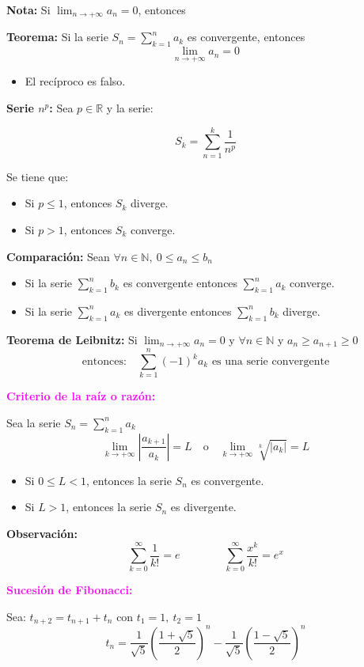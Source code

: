 \documentclass[11pt,a4paper]{article}
\begin{document}
\textbf{Nota:} Si $\displaystyle\lim_{n\to+\infty}a_n = 0$, entonces \quad
{}

\textbf{Teorema:} Si la serie $S_n = \displaystyle\sum_{k=1}^{n}a_k$ es convergente, entonces
\[\lim_{n\to+\infty}a_n = 0\]
\begin{itemize}
  \item El recíproco es falso.
\end{itemize}

\textbf{Serie $n^p$:} Sea $p \in \mathbb{R}$ y la serie:

\begin{minipage}{0.436\textwidth}
\[S_k = \sum_{n=1}^{k}\frac{1}{n^p}\]
\end{minipage}\hfill
\begin{minipage}{0.533\textwidth}
Se tiene que:
\begin{itemize}
  \item Si $p \leq 1$, entonces $S_k$ diverge.
  \item Si $p > 1$, entonces $S_k$ converge.
\end{itemize}
\end{minipage}

\textbf{Comparación:} Sean $\forall n \in \mathbb{N},\ 0 \leq a_n \leq b_n$
\begin{itemize}
  \item Si la serie $\displaystyle\sum_{k=1}^{n}b_k$ es convergente entonces
  $\displaystyle\sum_{k=1}^{n}a_k$ converge.
  \item Si la serie $\displaystyle\sum_{k=1}^{n}a_k$ es divergente entonces
  $\displaystyle\sum_{k=1}^{n}b_k$ diverge.
\end{itemize}

\textcolor{verde}{\textbf{Teorema de Leibnitz:}} Si $\displaystyle\lim_{n\to+\infty}a_n = 0$ y
$\forall n \in \mathbb{N}$ y $a_n \geq a_{n+1} \geq 0$
\[\text{entonces:} \quad \sum_{k=1}^{n}(-1)^k a_k \text{ es una serie convergente}\]

\textcolor{magenta}{\textbf{Criterio de la raíz o razón:}}

Sea la serie $S_n = \displaystyle\sum_{k=1}^{n}a_k$
\[
\lim_{k\to+\infty}\left|\frac{a_{k+1}}{a_k}\right| = L \quad \text{o} \quad
\lim_{k\to+\infty}\sqrt[k]{|a_k|} = L
\]
\begin{itemize}
  \item Si $0 \leq L < 1$, entonces la serie $S_n$ es convergente.
  \item Si $L > 1$, entonces la serie $S_n$ es divergente.
\end{itemize}

\textbf{Observación:}
\[\sum_{k=0}^{\infty}\frac{1}{k!} = e \qquad\qquad \sum_{k=0}^{\infty}\frac{x^k}{k!} = e^x\]

\textcolor{magenta}{\textbf{Sucesión de Fibonacci:}}

Sea: \quad $t_{n+2} = t_{n+1} + t_n$ \quad con $t_1 = 1,\ t_2 = 1$
\[
t_n = \frac{1}{\sqrt{5}}\left(\frac{1 + \sqrt{5}}{2}\right)^n - \frac{1}{\sqrt{5}}\left(\frac{1 - \sqrt{5}}{2}\right)^n
\]
\end{document}
